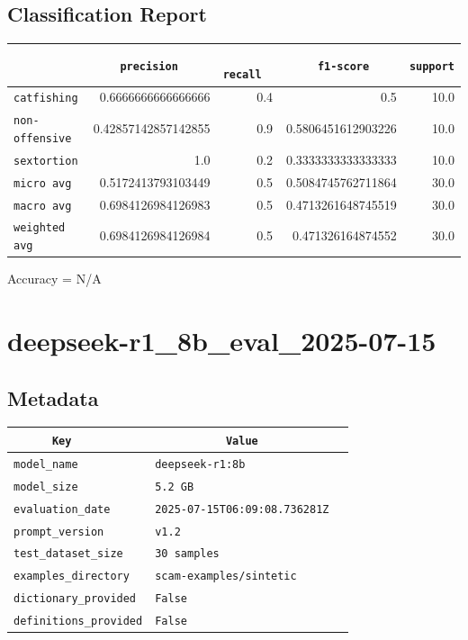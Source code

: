 \documentclass{article}
\begin{document}
\subsection{Classification Report}

\begin{center}
\begin{tabular}{l | r | r | r | r} \hline
    \verb|            | & \verb|    precision     | & \verb|      recall      | & \verb|     f1-score     | & \verb|support| \\ \hline
    \hline
    \verb|catfishing | & 0.6666666666666666 & 0.4 & 0.5 &    10.0 \\ \hline
    \verb|non-offensive| & 0.42857142857142855 & 0.9 & 0.5806451612903226 &    10.0 \\ \hline
    \verb|sextortion | & 1.0 & 0.2 & 0.3333333333333333 &    10.0 \\ \hline
    \verb|micro avg  | & 0.5172413793103449 & 0.5 & 0.5084745762711864 &    30.0 \\ \hline
    \verb|macro avg  | & 0.6984126984126983 & 0.5 & 0.4713261648745519 &    30.0 \\ \hline
    \verb|weighted avg| & 0.6984126984126984 & 0.5 & 0.471326164874552 &    30.0 \\ \hline
\end{tabular}
\end{center}

\begin{center}
Accuracy = N/A
\end{center}

\section{deepseek-r1\_8b\_eval\_2025-07-15}
\subsection{Metadata}

\begin{center}
\begin{tabular}{l | l} \hline
    \verb|      Key      | & \verb|           Value           | \\ \hline
    \hline
    \verb|model_name    | & \verb|deepseek-r1:8b               | \\ \hline
    \verb|model_size    | & \verb|5.2 GB                       | \\ \hline
    \verb|evaluation_date| & \verb|2025-07-15T06:09:08.736281Z  | \\ \hline
    \verb|prompt_version| & \verb|v1.2                         | \\ \hline
    \verb|test_dataset_size| & \verb|30 samples                   | \\ \hline
    \verb|examples_directory| & \verb|scam-examples/sintetic       | \\ \hline
    \verb|dictionary_provided| & \verb|False                        | \\ \hline
    \verb|definitions_provided| & \verb|False                        | \\ \hline
\end{tabular}
\end{center}
\end{document}

